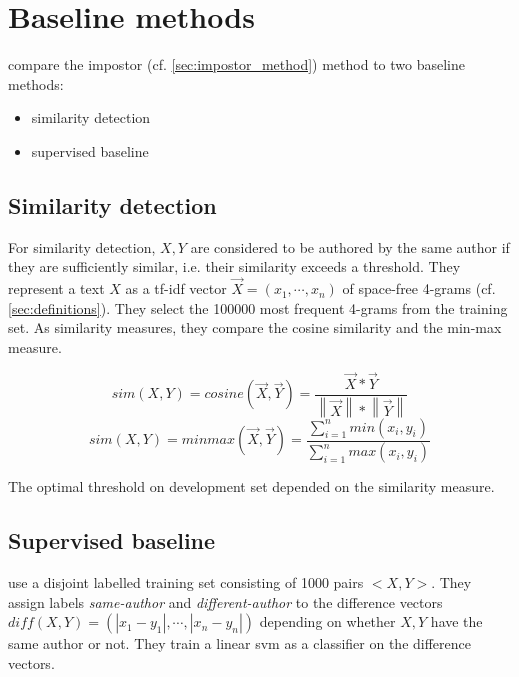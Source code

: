 \section{Baseline methods}
\label{sec:impostor_baseline_methods}

\citet{koppel_determining_2014} compare the impostor (cf. \autoref{sec:impostor_method}) method to two baseline methods:
\begin{itemize}
    \item similarity detection
    \item supervised baseline
\end{itemize}


\subsection{Similarity detection}
\label{sec:imp_similarity_detection}

For similarity detection, $X,Y$ are considered to be authored by the same author if they are sufficiently similar, 
i.e. their similarity exceeds a threshold.
They represent a text $X$ as a tf-idf vector $\overrightarrow{X}= (x_1, \cdots , x_n)$ 
of space-free 4-grams (cf. \autoref{sec:definitions}).
They select the 100000 most frequent 4-grams from the training set.
As similarity measures, they compare the cosine similarity and the min-max measure.

$$sim(X,Y)=cosine(\overrightarrow{X},\overrightarrow{Y})=\frac{\overrightarrow{X}*\overrightarrow{Y}}{\left\| \overrightarrow{X} \right\|*\left\| \overrightarrow{Y} \right\|}$$
$$sim(X,Y)=minmax(\overrightarrow{X},\overrightarrow{Y})=\frac{\sum_{i=1}^{n}min(x_i,y_i)}{\sum_{i=1}^{n}max(x_i,y_i)}$$

The optimal threshold on \citet{koppel_determining_2014} development set depended on the similarity measure.


\subsection{Supervised baseline}
\label{sec:imp_supervised_baseline}

\citet{koppel_determining_2014} use a disjoint labelled training set consisting of 1000 pairs $<X,Y>$.
They assign labels \textit{same-author} and \textit{different-author} 
to the difference vectors $diff(X,Y)= (\left| x_1-y_1 \right|, \cdots , \left| x_n-y_n \right|)$ 
depending on whether $X,Y$ have the same author or not.
They train a linear \ac{svm} as a classifier on the difference vectors.
